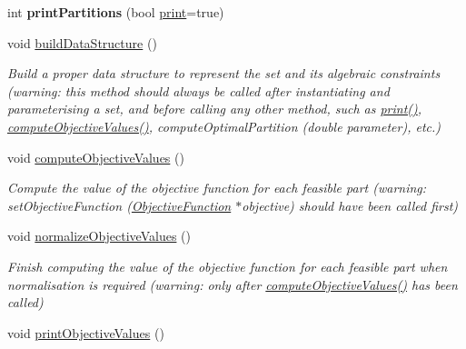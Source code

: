 \begin{DoxyCompactItemize}
\item 
\hypertarget{classNonconstrainedSet_aa82880d02050df39dee205aef8b5fded}{int {\bfseries print\-Partitions} (bool \hyperlink{classNonconstrainedSet_a7d08b45f9f37f5285fee36fb98aa58af}{print}=true)}\label{classNonconstrainedSet_aa82880d02050df39dee205aef8b5fded}

\item 
\hypertarget{classNonconstrainedSet_af9e6644582edf44d7bcf4e4b64a08bc0}{void \hyperlink{classNonconstrainedSet_af9e6644582edf44d7bcf4e4b64a08bc0}{build\-Data\-Structure} ()}\label{classNonconstrainedSet_af9e6644582edf44d7bcf4e4b64a08bc0}

\begin{DoxyCompactList}\small\item\em Build a proper data structure to represent the set and its algebraic constraints (warning\-: this method should always be called after instantiating and parameterising a set, and before calling any other method, such as \hyperlink{classNonconstrainedSet_a7d08b45f9f37f5285fee36fb98aa58af}{print()}, \hyperlink{classNonconstrainedSet_a54d78c6dda39fd6d98c6f151b7350a02}{compute\-Objective\-Values()}, compute\-Optimal\-Partition (double parameter), etc.) \end{DoxyCompactList}\item 
\hypertarget{classNonconstrainedSet_a54d78c6dda39fd6d98c6f151b7350a02}{void \hyperlink{classNonconstrainedSet_a54d78c6dda39fd6d98c6f151b7350a02}{compute\-Objective\-Values} ()}\label{classNonconstrainedSet_a54d78c6dda39fd6d98c6f151b7350a02}

\begin{DoxyCompactList}\small\item\em Compute the value of the objective function for each feasible part (warning\-: set\-Objective\-Function (\hyperlink{classObjectiveFunction}{Objective\-Function} $\ast$objective) should have been called first) \end{DoxyCompactList}\item 
\hypertarget{classNonconstrainedSet_a8f9d197b844e06d1efc08215f6c38f88}{void \hyperlink{classNonconstrainedSet_a8f9d197b844e06d1efc08215f6c38f88}{normalize\-Objective\-Values} ()}\label{classNonconstrainedSet_a8f9d197b844e06d1efc08215f6c38f88}

\begin{DoxyCompactList}\small\item\em Finish computing the value of the objective function for each feasible part when normalisation is required (warning\-: only after \hyperlink{classNonconstrainedSet_a54d78c6dda39fd6d98c6f151b7350a02}{compute\-Objective\-Values()} has been called) \end{DoxyCompactList}\item 
\hypertarget{classNonconstrainedSet_a9cc495ca7b303fd1b24bc7cadcc9bfc4}{void \hyperlink{classNonconstrainedSet_a9cc495ca7b303fd1b24bc7cadcc9bfc4}{print\-Objective\-Values} ()}\label{classNonconstrainedSet_a9cc495ca7b303fd1b24bc7cadcc9bfc4}


\end{DoxyCompactItemize}
